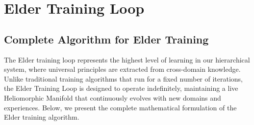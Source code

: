 \section{Elder Training Loop}

\subsection{Complete Algorithm for Elder Training}

The Elder training loop represents the highest level of learning in our hierarchical system, where universal principles are extracted from cross-domain knowledge. Unlike traditional training algorithms that run for a fixed number of iterations, the Elder Training Loop is designed to operate indefinitely, maintaining a live Heliomorphic Manifold that continuously evolves with new domains and experiences. Below, we present the complete mathematical formulation of the Elder training algorithm.

